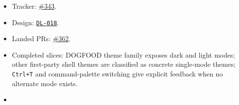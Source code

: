 \begin{itemize}
\tightlist
\item
  Tracker: \href{https://github.com/flyingrobots/bijou/issues/343}{\#343}.
\item
  Design: \href{https://github.com/flyingrobots/bijou/blob/cbd70612140e7a450d764b3c7be1c6af878b99bc/docs/design/DL-018-first-party-theme-variant-coverage.md}{\texttt{D\allowbreak{}L\allowbreak{}-\allowbreak{}0\allowbreak{}1\allowbreak{}8}}.
\item
  Landed PRs: \href{https://github.com/flyingrobots/bijou/pull/362}{\#362}.
\item
  Completed slices: DOGFOOD theme family exposes dark and light modes; other first-party shell themes are classified as concrete single-mode themes; \texttt{C\allowbreak{}t\allowbreak{}r\allowbreak{}l\allowbreak{}+\allowbreak{}T} and command-palette switching give explicit feedback when no alternate mode exists.
\item

\end{itemize}
